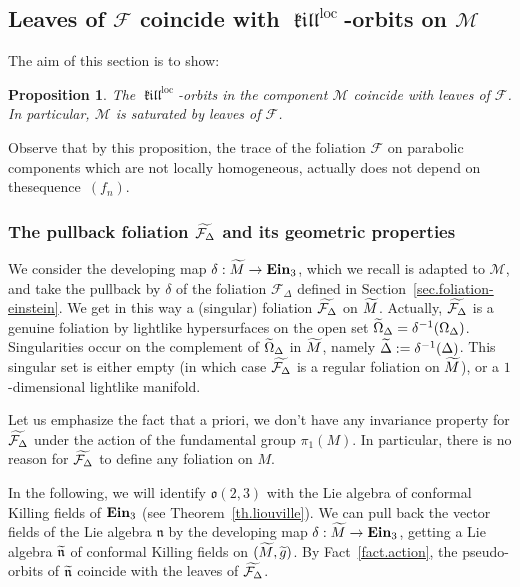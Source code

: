 \documentclass[11pt]{article}
\newtheorem{prop}[theo]{Proposition}
\theoremstyle{definition}
\numberwithin{equation}{section}
\numberwithin{figure}{section}
\numberwithin{table}{section}
\DeclareMathOperator{\ein}{{\bf Ein}_3}
\DeclareMathOperator{\loc}{loc}
\DeclareMathOperator{\kil}{{\mathfrak{kill}}}
\newcommand{\kiloc}{\kil^{\loc}}
\newcommand{\calf}{\mathcal{F}}
\newcommand{\calm}{\mathcal{M}}
\newcommand{\tm}{\tilde{{M}}}
\newcommand{\tcalfd}{\tilde{{\mathcal{F}_{\Delta}}}}
\newcommand{\lien}{{\mathfrak{n}}}
\newcommand{\tlien}{\tilde{\mathfrak{n}}}
\newcommand{\oo}{{\mathfrak{o}}}
\let\oldtilde\tilde
\renewcommand*\tilde[1]{\mathchoice{\widetilde{#1}}{\widetilde{#1}}{\widetilde{#1}}{\oldtilde{#1}}}
\begin{document}
\subsection{Leaves of \texorpdfstring{$\calf$}{calf} coincide with \texorpdfstring{$\kiloc$}{kiloc}-orbits on \texorpdfstring{$\calm$}{calm}}\label{sec.calfetkill}
The aim of this section is to show:

\begin{prop}\label{prop.coincidencecalf}
The $\kiloc$-orbits in the component $\calm$ coincide with leaves of $\calf$. In particular, $\calm$ is saturated by leaves of $\calf$.
\end{prop}

Observe that by this proposition, the trace of the foliation ${\calf}$ on parabolic components which are not locally homogeneous, actually does not depend on the\linebreak sequence~$(f_n)$.

\subsubsection{The pullback foliation \texorpdfstring{$\tcalfd$}{tcalfd} and its geometric properties}\label{sec.pulbackfolia}

We consider the developing map $\delta : \tm \to \ein$, which we recall is adapted to $\calm$, and take the pullback by $\delta$ of the foliation ${\calf}_{\Delta}$ defined in Section~\ref{sec.foliation-einstein}. We get in this way a (singular) foliation $\tcalfd$ on $\tm$. Actually, $\tcalfd$ is a genuine foliation by lightlike hypersurfaces on the open set $\tilde{\Omega}_{\Delta}=\delta^{-1}(\Omega_{\Delta})$. Singularities occur on the complement of $\tilde{\Omega}_{\Delta}$ in $\tm$, namely $\tilde{\Delta}:=\delta^{-1}(\Delta)$. This singular set is either empty (in which case $\tcalfd$ is a regular foliation on $\tm$), or a $1$-dimensional lightlike manifold.

Let us emphasize the fact that a priori, we don't have any invariance property for $\tcalfd$ under the action of the fundamental group $\pi_1(M)$. In particular, there is no reason for $\tcalfd$ to define any foliation on $M$.

In the following, we will identify $\oo(2,3)$ with the Lie algebra of conformal Killing fields of $\ein$ (see Theorem~\ref{th.liouville}). We can pull back the vector fields of the Lie algebra $\lien$ by the developing map $\delta:\tm \to \ein$, getting a Lie algebra $\tlien$ of conformal Killing fields on $(\tm,{\tilde{g}})$. By Fact~\ref{fact.action}, the pseudo-orbits of $\tlien$ coincide with the leaves of $\tcalfd$.
\end{document}
